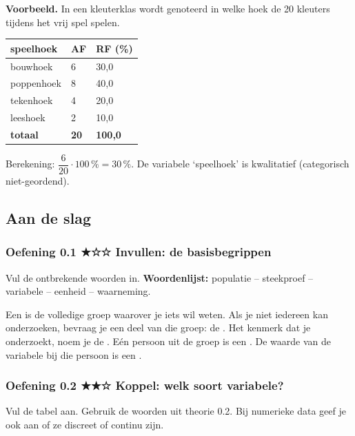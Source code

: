 \begin{voorbeeld}
\textbf{Voorbeeld.} In een kleuterklas wordt genoteerd in welke hoek de 20 kleuters tijdens het vrij spel spelen.

\begin{tabular}{lll}
\hline
speelhoek & AF & RF (\%) \\
\hline
bouwhoek & 6 & 30,0 \\
poppenhoek & 8 & 40,0 \\
tekenhoek & 4 & 20,0 \\
leeshoek & 2 & 10,0 \\
\textbf{totaal} & \textbf{20} & \textbf{100,0} \\
\hline
\end{tabular}

Berekening: $\dfrac{6}{20}\cdot 100\,\% = 30\,\%$. De variabele ‘speelhoek’ is kwalitatief (categorisch niet-geordend).
\end{voorbeeld}

\subsection*{Aan de slag}

\subsubsection*{Oefening 0.1 \quad ★☆☆ \quad Invullen: de basisbegrippen}

Vul de ontbrekende woorden in. \textbf{Woordenlijst:} populatie – steekproef – variabele – eenheid – waarneming.

Een  is de volledige groep waarover je iets wil weten. Als je niet iedereen kan onderzoeken, bevraag je een deel van die groep: de . Het kenmerk dat je onderzoekt, noem je de . Eén persoon uit de groep is een . De waarde van de variabele bij die persoon is een .

\subsubsection*{Oefening 0.2 \quad ★★☆ \quad Koppel: welk soort variabele?}

Vul de tabel aan. Gebruik de woorden uit theorie 0.2. Bij numerieke data geef je ook aan of ze discreet of continu zijn.

